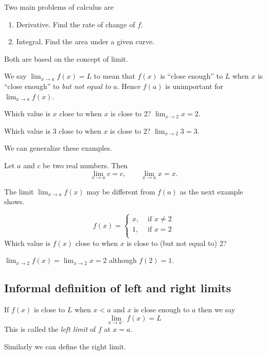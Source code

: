 \documentclass[../main.tex]{subfiles}
\begin{document}
Two main problems of calculus are
\begin{enumerate}
  \item Derivative. Find the rate of change of $f$.
  \item Integral. Find the area under a given curve.
\end{enumerate}
Both are based on the concept of limit.

We say $\lim_{x \to a} f(x) = L$ to mean that $f(x)$ is ``close enough'' to $L$ when $x$ is ``close enough'' to \emph{but not equal to} $a$. Hence $f(a)$ is unimportant for $\lim_{x \to a} f(x)$.

\begin{example}
  Which value is $x$ close to when $x$ is close to 2? $\lim_{x \to 2} x = 2$.
\end{example}

\begin{example}
  Which value is 3 close to when $x$ is close to 2? $\lim_{x \to 2} 3 = 3$.
\end{example}

We can generalize these examples.
\begin{theorem}
\label{basic limit theorems}
  Let $a$ and $c$ be two real numbers. Then
  \[
    \lim_{x \to a} c = c, \qquad
    \lim_{x \to a} x = x.
  \]
\end{theorem}


The limit $\lim_{x \to a} f(x)$ may be different from $f(a)$ as the next example shows.
\begin{example}
  \[
    f(x) =
    \begin{cases}
      x, &\text{ if } x\neq 2\\
      1, &\text{ if } x = 2\\
    \end{cases}
  \]
  Which value is $f(x)$ close to when $x$ is close to (but not equal to) 2?

  $\lim_{x \to 2} f(x) = \lim_{x \to 2} x = 2$ although $f(2) = 1$.
\end{example}

\subsection*{Informal definition of left and right limits}
If $f(x)$ is close to $L$ when $x<a$ and $x$ is close enough to $a$ then we say
\[
  \lim_{x \to a^{-}} f(x) = L
\]
This is called the \emph{left limit} of $f$ at $x=a$.

Similarly we can define the right limit.
\end{document}
